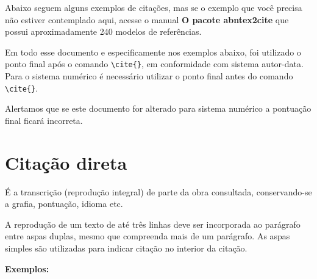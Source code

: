 Abaixo seguem alguns exemplos de citações, mas se o exemplo que você precisa não estiver contemplado aqui, acesse o manual \textbf{O pacote abntex2cite} que possui aproximadamente 240 modelos de referências.

Em todo esse documento e especificamente nos exemplos abaixo, foi utilizado o ponto final após o comando \verb+\cite{}+, em conformidade com sistema autor-data. Para o sistema numérico é necessário utilizar o ponto final antes do comando \verb+\cite{}+. 

Alertamos que se este documento for alterado para sistema numérico a pontuação final ficará incorreta. \\

\section{Citação direta}

É a transcrição (reprodução integral) de parte da obra consultada, conservando-se a grafia, pontuação, idioma etc.

A reprodução de um texto de até três linhas deve ser incorporada ao parágrafo entre aspas duplas, mesmo que compreenda mais de um parágrafo. As aspas simples são utilizadas para indicar citação no interior da citação.

\textbf{Exemplos:}

